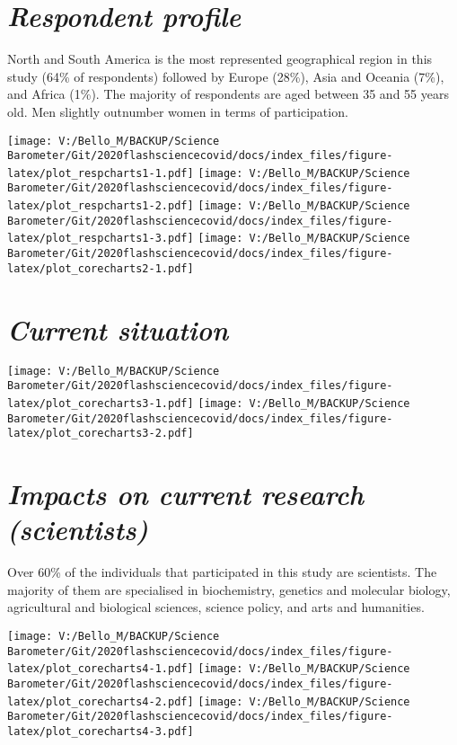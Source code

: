 \documentclass[
]{article}
\begin{document}
\hypertarget{respondent-profile}{%
\section{\texorpdfstring{\emph{Respondent
profile}}{Respondent profile}}\label{respondent-profile}}

North and South America is the most represented geographical region in
this study (64\% of respondents) followed by Europe (28\%), Asia and
Oceania (7\%), and Africa (1\%). The majority of respondents are aged
between 35 and 55 years old. Men slightly outnumber women in terms of
participation.

\texttt{[image: V:/Bello\_M/BACKUP/Science Barometer/Git/2020flashsciencecovid/docs/index\_files/figure-latex/plot\_respcharts1-1.pdf]}
\texttt{[image: V:/Bello\_M/BACKUP/Science Barometer/Git/2020flashsciencecovid/docs/index\_files/figure-latex/plot\_respcharts1-2.pdf]}
\texttt{[image: V:/Bello\_M/BACKUP/Science Barometer/Git/2020flashsciencecovid/docs/index\_files/figure-latex/plot\_respcharts1-3.pdf]}
\texttt{[image: V:/Bello\_M/BACKUP/Science Barometer/Git/2020flashsciencecovid/docs/index\_files/figure-latex/plot\_corecharts2-1.pdf]}

\hypertarget{current-situation}{%
\section{\texorpdfstring{\emph{Current
situation}}{Current situation}}\label{current-situation}}

\texttt{[image: V:/Bello\_M/BACKUP/Science Barometer/Git/2020flashsciencecovid/docs/index\_files/figure-latex/plot\_corecharts3-1.pdf]}
\texttt{[image: V:/Bello\_M/BACKUP/Science Barometer/Git/2020flashsciencecovid/docs/index\_files/figure-latex/plot\_corecharts3-2.pdf]}

\hypertarget{impacts-on-current-research-scientists}{%
\section{\texorpdfstring{\emph{Impacts on current research
(scientists)}}{Impacts on current research (scientists)}}\label{impacts-on-current-research-scientists}}

Over 60\% of the individuals that participated in this study are
scientists. The majority of them are specialised in biochemistry,
genetics and molecular biology, agricultural and biological sciences,
science policy, and arts and humanities.

\texttt{[image: V:/Bello\_M/BACKUP/Science Barometer/Git/2020flashsciencecovid/docs/index\_files/figure-latex/plot\_corecharts4-1.pdf]}
\texttt{[image: V:/Bello\_M/BACKUP/Science Barometer/Git/2020flashsciencecovid/docs/index\_files/figure-latex/plot\_corecharts4-2.pdf]}
\texttt{[image: V:/Bello\_M/BACKUP/Science Barometer/Git/2020flashsciencecovid/docs/index\_files/figure-latex/plot\_corecharts4-3.pdf]}
\end{document}
